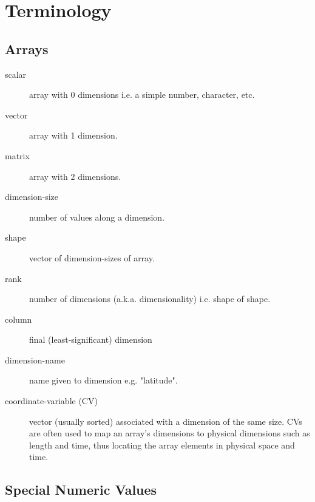 
\section{Terminology}

\subsection{Arrays}

    \begin{description}
      \item[scalar]
      array with 0 dimensions i.e. a simple number, character,
      etc.
      \item[vector]
      array with 1 dimension.
      \item[matrix]
      array with 2 dimensions.
      \item[dimension-size]
      number of values along a dimension.
      \item[shape]
      vector of dimension-sizes of array.
      \item[rank]
      number of dimensions (a.k.a. dimensionality) i.e. shape of
      shape.
      \item[column]
      final (least-significant) dimension
      \item[dimension-name]
      name given to dimension e.g. "latitude".
      \item[coordinate-variable (CV)]
      vector (usually sorted) associated with a dimension of the
      same size. CVs are often used to map an array's dimensions to
      physical dimensions such as length and time, thus locating the
      array elements in physical space and time.
    \end{description}

\subsection{Special Numeric Values}

